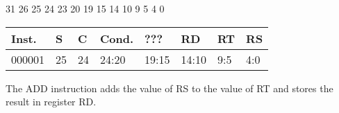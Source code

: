 \documentclass[12pt]{article}
\begin{document}
    \hspace{1.6cm}31 \hspace{1.2cm}26 \hspace{.075cm}25 \hspace{.15cm}24 \hspace{.075cm}23 \hspace{.875cm}20 \hspace{.04cm}19 \hspace{.8cm}15 \hspace{.04cm}14 \hspace{.8cm}10 \hspace{.04cm}9 \hspace{1.15cm}5 \hspace{.04cm}4 \hspace{1.25cm}0
    \vspace{-.25cm}
    \begin{center}
        \begin{tabular}{ |p{1.8cm}|p{.3cm}|p{.3cm}|p{1.5cm}|p{1.5cm}|p{1.5cm}|p{1.5cm}|p{1.5cm}| }
            \hline
            \textbf{Inst.} & \textbf{S}& \textbf{C} & \textbf{Cond.} & ??? & \textbf{RD} & \textbf{RT} & \textbf{RS}\\
            \hline
            000001& 25 & 24 & 24:20 & 19:15 & 14:10 & 9:5 & 4:0\\
            \hline
        \end{tabular}
    \end{center}
    
    \noindent
    The ADD instruction adds the value of RS to the value of RT and stores the result in register RD. 
    
\end{document}
